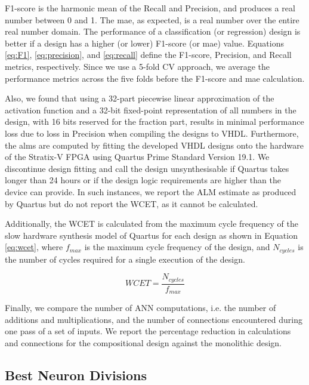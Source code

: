 F1-score is the harmonic mean of the Recall and Precision, and produces a real number between 0 and 1. The \gls{mae}, as expected, is a real number over the entire real number domain. The performance of a classification (or regression) design is better if a design has a higher (or lower) F1-score (or \gls{mae}) value. Equations \ref{eq:F1}, \ref{eq:precision}, and \ref{eq:recall} define the F1-score, Precision, and Recall metrics, respectively. Since we use a 5-fold CV approach, we average the performance metrics across the five folds before the F1-score and \gls{mae} calculation.
    
Also, we found that using a 32-part piecewise linear approximation of the activation function and a 32-bit fixed-point representation of all numbers in the design, with 16 bits reserved for the fraction part, results in minimal performance loss due to loss in Precision when compiling the designs to VHDL. Furthermore, the \glspl{alm} are computed by fitting the developed VHDL designs onto the hardware of the Stratix-V FPGA using Quartus Prime Standard Version 19.1. We discontinue design fitting and call the design unsynthesisable if Quartus takes longer than 24 hours or if the design logic requirements are higher than the device can provide. In such instances, we report the ALM estimate as produced by Quartus but do not report the WCET, as it cannot be calculated. 

Additionally, the WCET is calculated from the maximum cycle frequency of the slow hardware synthesis model of Quartus for each design as shown in Equation \ref{eq:wcet}, where $f_{max}$ is the maximum cycle frequency of the design, and $N_{cycles}$ is the number of cycles required for a single execution of the design.


\begin{equation}
 WCET = \frac{N_{cycles}}
 {f_{max}}
    \label{eq:wcet}
\end{equation}

 

Finally, we compare the number of ANN computations, i.e. the number of additions and multiplications, and the number of connections encountered during one pass of a set of inputs. We report the percentage reduction in calculations and connections for the compositional design against the monolithic design.


\subsection{Best Neuron Divisions}


